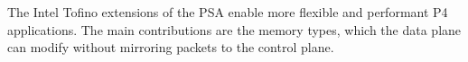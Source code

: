 The Intel Tofino extensions of the \ac{PSA} enable more flexible and performant P4 applications. The main contributions are the memory types, which the data plane can modify without mirroring packets to the control plane.


%
%
%
